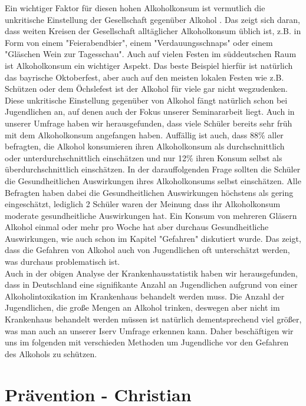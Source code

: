 \documentclass[12pt]{article}
\begin{document}
Ein wichtiger Faktor für diesen hohen Alkoholkonsum ist vermutlich die unkritische Einstellung der Gesellschaft gegenüber Alkohol \autocite{noauthor_alkoholkonsum_nodate}. Das zeigt sich daran, dass weiten Kreisen der Gesellschaft alltäglicher Alkoholkonsum üblich ist, z.B. in Form von einem "Feierabendbier", einem "Verdauungsschnaps" oder einem "Gläschen Wein zur Tagesschau". Auch auf vielen Festen im süddeutschen Raum ist Alkoholkonsum ein wichtiger Aspekt. Das beste Beispiel hierfür ist natürlich das bayrische Oktoberfest, aber auch auf den meisten lokalen Festen wie z.B. Schützen oder dem Öchslefest ist der Alkohol für viele gar nicht wegzudenken. Diese unkritische Einstellung gegenüber von Alkohol fängt natürlich schon bei Jugendlichen an, auf denen auch der Fokus unserer Seminararbeit liegt. Auch in unserer Umfrage haben wir herausgefunden, dass viele Schüler bereits sehr früh mit dem Alkoholkonsum angefangen haben. Auffällig ist auch, dass 88\% aller befragten, die Alkohol konsumieren ihren Alkoholkonsum als durchschnittlich oder unterdurchschnittlich einschätzen und nur 12\% ihren Konsum selbst als überdurchschnittlich einschätzen. In der darauffolgenden Frage sollten die Schüler die Gesundheitlichen Auswirkungen ihres Alkoholkonsums selbst einschätzen. Alle Befragten haben dabei die Gesundheitlichen Auswirkungen höchstens als gering eingeschätzt, lediglich 2 Schüler waren der Meinung dass ihr Alkoholkonsum moderate gesundheitliche Auswirkungen hat. Ein Konsum von mehreren Gläsern Alkohol einmal oder mehr pro Woche hat aber durchaus Gesundheitliche Auswirkungen, wie auch schon im Kapitel "Gefahren" diskutiert wurde. Das zeigt, dass die Gefahren von Alkohol auch von Jugendlichen oft unterschätzt werden, was durchaus problematisch ist.\\
Auch in der obigen Analyse der Krankenhausstatistik haben wir herausgefunden, dass in Deutschland eine signifikante Anzahl an Jugendlichen aufgrund von einer Alkoholintoxikation im Krankenhaus behandelt werden muss. Die Anzahl der Jugendlichen, die große Mengen an Alkohol trinken, deswegen aber nicht im Krankenhaus behandelt werden müssen ist natürlich dementsprechend viel größer, was man auch an unserer Iserv Umfrage erkennen kann. %
Daher beschäftigen wir uns im folgenden mit verschieden Methoden um Jugendliche vor den Gefahren des Alkohols zu schützen. 


\section{Prävention \footnotesize{- Christian}}
\end{document}
